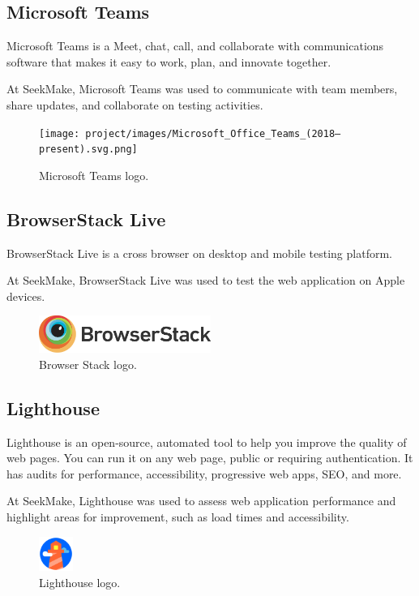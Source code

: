 \subsection{Microsoft Teams}
Microsoft Teams is a Meet, chat, call, and collaborate with communications software that makes it easy to work, plan, and innovate together. \cite{msteams}

At SeekMake, Microsoft Teams was used to communicate with team members, share updates, and collaborate on testing activities.

\begin{figure}[H]
    \centering
    \texttt{[image: project/images/Microsoft\_Office\_Teams\_(2018–present).svg.png]}
    \caption{Microsoft Teams logo.}
    \label{fig:msteams-logo}
\end{figure}

\subsection{BrowserStack Live}
BrowserStack Live is a cross browser on desktop and mobile testing platform. \cite{browserstack}

At SeekMake, BrowserStack Live was used to test the web application on Apple devices.

\begin{figure}[H]
    \centering
    \includegraphics[width=0.5\textwidth]{project/images/BrowserStack_idTaghUsQq_1.png}
    \caption{Browser Stack logo.}
    \label{fig:browserstack-logo}
\end{figure}

\subsection{Lighthouse}

Lighthouse is an open-source, automated tool to help you improve the quality of web pages. You can run it on any web page, public or requiring authentication. It has audits for performance, accessibility, progressive web apps, SEO, and more.

At SeekMake, Lighthouse was used to assess web application performance and highlight areas for improvement, such as load times and accessibility.

\begin{figure}[H]
    \centering
    \includegraphics[width=0.1\textwidth]{project/images/lighthouse-logo_512px.png}
    \caption{Lighthouse logo.}
    \label{fig:lighthouse-logo}
\end{figure}

